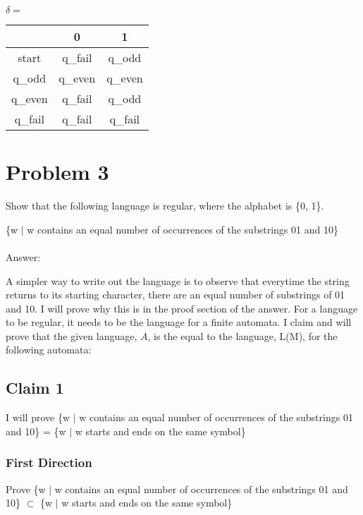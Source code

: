 \documentclass[letterpaper, 11pt]{article}
\begin{document}
$\delta = $
\begin{tabular}{|c|c|c|}
  \hline
   & 0 & 1\\
  \hline
  start & q\_fail & q\_odd\\
  \hline
  q\_odd & q\_even & q\_even\\
  \hline
  q\_even & q\_fail & q\_odd\\
  \hline
  q\_fail & q\_fail & q\_fail\\
  \hline
\end{tabular}
\newpage
\section{Problem 3}
Show that the following language is regular, where the alphabet is \{0, 1\}.

\{w $\mid$ w contains an equal number of occurrences of the substrings 01 and 10\}\\\\
Answer:

A simpler way to write out the language is to observe that everytime the string returns to its starting character, there are an equal number of substrings of 01 and 10.
I will prove why this is in the proof section of the answer.
For a language to be regular, it needs to be the language for a finite automata.
I claim and will prove that the given language, $A$, is the equal to the language, L(M), for the following automata:


\subsection*{Claim 1}
I will prove \{w $\mid$ w contains an equal number of occurrences of the substrings 01 and 10\} = \{w $\mid$ w starts and ends on the same symbol\}

\subsubsection*{First Direction}
Prove \{w $\mid$ w contains an equal number of occurrences of the substrings 01 and 10\} $\subset$ \{w $\mid$ w starts and ends on the same symbol\}
\end{document}
